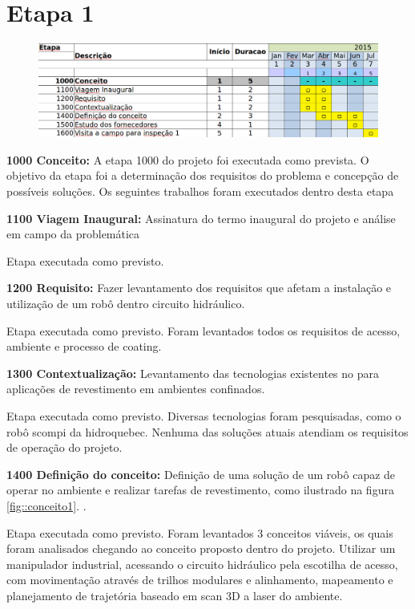 

\section{Etapa 1}

\begin{figure}[H]
\centering
\includegraphics[width=0.9\columnwidth]{figs/etapa1}
\end{figure} 

\textbf{1000 Conceito:} A etapa 1000 do projeto foi executada como prevista. O
objetivo da etapa foi a determinação dos requisitos do problema e concepção de
possíveis soluções. Os seguintes trabalhos foram executados dentro desta etapa

\noindent
\textbf{1100 Viagem Inaugural:} Assinatura do termo inaugural do projeto e
análise em campo da problemática

Etapa executada como previsto. 


\noindent
\textbf{1200 Requisito:} Fazer levantamento dos requisitos que afetam a
instalação e utilização de um robô dentro circuito hidráulico.

Etapa executada como previsto. Foram levantados todos os requisitos de acesso,
ambiente e processo de coating.

\noindent
\textbf{1300 Contextualização:} Levantamento das tecnologias existentes no para
aplicações de revestimento em ambientes confinados.

Etapa executada como previsto. Diversas tecnologias foram pesquisadas, como o
robô scompi da hidroquebec. Nenhuma das soluções atuais atendiam os requisitos
de operação do projeto.

\noindent
\textbf{1400 Definição do conceito:} Definição de uma solução de um robô capaz
de operar no ambiente e realizar tarefas de revestimento, como ilustrado na
figura \ref{fig::conceito1}.				 .

Etapa executada como previsto. Foram levantados 3 conceitos viáveis, os quais
foram analisados chegando ao conceito proposto dentro do projeto. Utilizar um
manipu\-lador industrial, acessando o circuito hidráulico pela escotilha de
acesso, com movimenta\-ção através de trilhos modulares e alinhamento,
mapeamento e planejamento de trajetória baseado em scan 3D a laser do ambiente.

